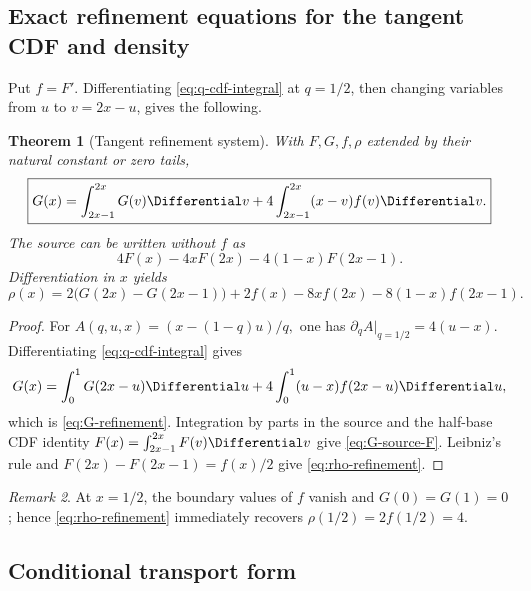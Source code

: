 \documentclass[11pt,oneside]{article}
\newtheorem{theorem}{Theorem}[section]
\theoremstyle{definition}
\theoremstyle{remark}
\newtheorem{remark}[theorem]{Remark}
\begin{document}
\subsection{Exact refinement equations for the tangent CDF and density}

Put \(f=F'\).  Differentiating \eqref{eq:q-cdf-integral} at \(q=1/2\), then changing variables
from \(u\) to \(v=2x-u\), gives the following.

\begin{theorem}[Tangent refinement system]
\label{thm:tangent-refinement}
With \(F,G,f,\rho\) extended by their natural constant or zero tails,
\begin{equation}
 \boxed{\displaystyle
 G(x)=\int_{2x-1}^{2x}G(v)\Differential v
      +4\int_{2x-1}^{2x}(x-v)f(v)\Differential v.}
 \label{eq:G-refinement}
\end{equation}
The source can be written without \(f\) as
\begin{equation}
 4F(x)-4xF(2x)-4(1-x)F(2x-1).
 \label{eq:G-source-F}
\end{equation}
Differentiation in \(x\) yields
\begin{equation}
 \boxed{\displaystyle
 \rho(x)=2\bigl(G(2x)-G(2x-1)\bigr)+2f(x)
 -8x f(2x)-8(1-x)f(2x-1).}
 \label{eq:rho-refinement}
\end{equation}
\end{theorem}

\begin{proof}
For
\(
 A(q,u,x)=(x-(1-q)u)/q,
\)
one has \(\partial_qA|_{q=1/2}=4(u-x)\).  Differentiating
\eqref{eq:q-cdf-integral} gives
\[
 G(x)=\int_0^1G(2x-u)\Differential u
      +4\int_0^1(u-x)f(2x-u)\Differential u,
\]
which is \eqref{eq:G-refinement}.  Integration by parts in the source and the half-base CDF
identity \(F(x)=\int_{2x-1}^{2x}F(v)\Differential v\) give \eqref{eq:G-source-F}.  Leibniz's rule and
\(
 F(2x)-F(2x-1)=f(x)/2
\)
give \eqref{eq:rho-refinement}.
\end{proof}

\begin{remark}
At \(x=1/2\), the boundary values of \(f\) vanish and \(G(0)=G(1)=0\); hence
\eqref{eq:rho-refinement} immediately recovers \(\rho(1/2)=2f(1/2)=4\).
\end{remark}

\subsection{Conditional transport form}
\end{document}
